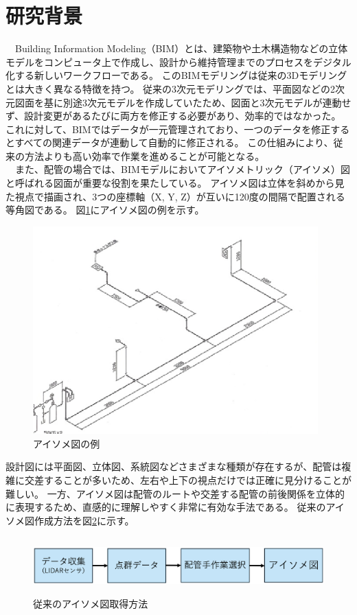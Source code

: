 \section{研究背景}
　Building Information Modeling（BIM）とは、建築物や土木構造物などの立体モデルをコンピュータ上で作成し、設計から維持管理までのプロセスをデジタル化する新しいワークフローである。
このBIMモデリングは従来の3Dモデリングとは大きく異なる特徴を持つ。
従来の3次元モデリングでは、平面図などの2次元図面を基に別途3次元モデルを作成していたため、図面と3次元モデルが連動せず、設計変更があるたびに両方を修正する必要があり、効率的ではなかった。
これに対して、BIMではデータが一元管理されており、一つのデータを修正するとすべての関連データが連動して自動的に修正される。
この仕組みにより、従来の方法よりも高い効率で作業を進めることが可能となる。\\
　また、配管の場合では、BIMモデルにおいてアイソメトリック（アイソメ）図と呼ばれる図面が重要な役割を果たしている。
アイソメ図は立体を斜めから見た視点で描画され、3つの座標軸（X, Y, Z）が互いに120度の間隔で配置される等角図である。
図\ref{fig:f1}にアイソメ図の例を示す。
\begin{figure}[htbt]
	\centering
	 \includegraphics[height=80mm]{Figure/ex_iso.eps}
	 \caption{アイソメ図の例}
	 \label{fig:f1}
\end{figure}
設計図には平面図、立体図、系統図などさまざまな種類が存在するが、配管は複雑に交差することが多いため、左右や上下の視点だけでは正確に見分けることが難しい。
一方、アイソメ図は配管のルートや交差する配管の前後関係を立体的に表現するため、直感的に理解しやすく非常に有効な手法である。
従来のアイソメ図作成方法を図\ref{fig:f2}に示す。
\begin{figure}[htbt]
	\centering
	 \includegraphics[height=22mm]{Figure/existing_research.eps}
	 \caption{従来のアイソメ図取得方法}
	 \label{fig:f2}
\end{figure}

